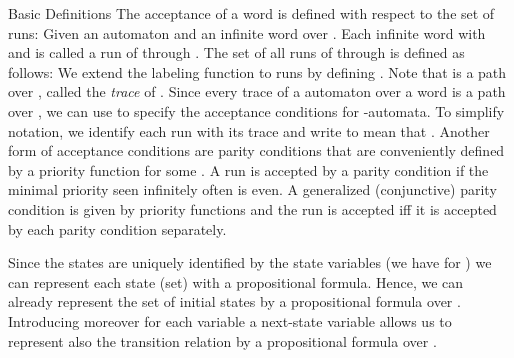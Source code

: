 \documentclass[copyright,creativecommons]{eptcs}
\begin{document}
\begin{section}{Basic Definitions}
The acceptance of a word is defined with respect to the set of runs: Given an automaton  and an infinite word  over . Each infinite word  with  and  is called a run of  through . The set of all runs of  through  is defined as follows: We extend the labeling function to runs by defining .
Note that  is a path over , called the \emph{trace} of . Since every trace of a automaton  over a word  is a path over , we can use  to specify the acceptance conditions for -automata. To simplify notation, we identify each run with its trace and write  to mean that . Another form of acceptance conditions are parity conditions that are conveniently defined by a priority function  for some . A run is accepted by a parity condition if the minimal priority seen infinitely often is even. A generalized (conjunctive) parity condition is given by  priority functions and the run is accepted iff it is accepted by each parity condition separately.


Since the states are uniquely identified by the state variables (we have  for )
we can represent each state (set) with a propositional formula.
Hence, we can already represent the set of initial states by a propositional formula  over .
Introducing moreover for each variable  a next-state variable  allows us to represent also
the transition relation by a propositional formula  over .
\end{section}
\end{document}
